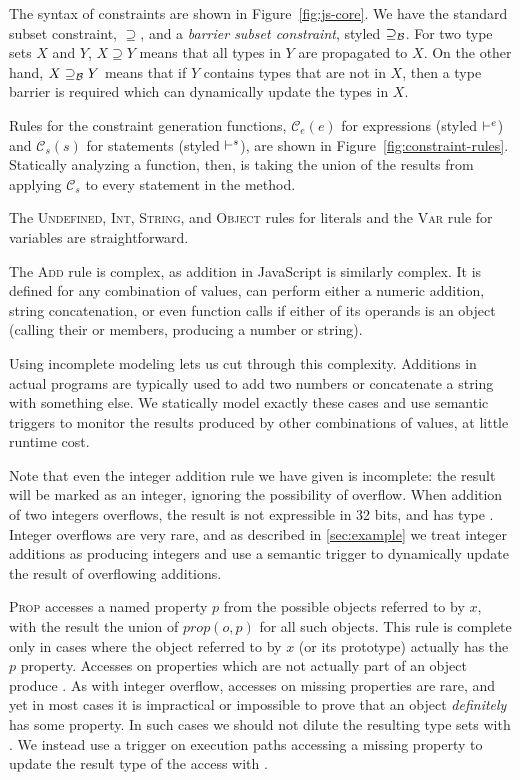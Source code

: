 The syntax of constraints are shown in Figure~\ref{fig:js-core}. We have the
standard subset constraint, $\supseteq$, and a \emph{barrier subset
  constraint}, styled $\supseteq_\mathcal{B}$. For two type sets $X$ and $Y$, $X \supseteq
Y$ means that all types in $Y$ are propagated to $X$. On the other hand, $X
\supseteq_\mathcal{B} Y$ means that if $Y$ contains types that are not in $X$, then a
type barrier is required which can dynamically update the types in $X$.

Rules for the constraint generation functions, $\mathcal{C}_e(e)$ for
expressions (styled $\vdash^e$) and $\mathcal{C}_s(s)$ for statements (styled $\vdash^s$),
are shown in
Figure~\ref{fig:constraint-rules}. Statically analyzing a function, then, is
taking the union of the results from applying $\mathcal{C}_s$ to every
statement in the method.

The \textsc{Undefined}, \textsc{Int}, \textsc{String}, and \textsc{Object}
rules for literals and the \textsc{Var} rule for variables are
straightforward.

The \textsc{Add} rule is complex, as addition in JavaScript is similarly complex. It is
defined for any combination of values, can perform either a numeric addition,
string concatenation, or even function calls if either of its operands is an
object (calling their  or  members, producing a
number or string).

Using incomplete modeling lets us cut through this complexity.
Additions in actual programs are typically used to add two numbers
or concatenate a string with something else.
We statically model exactly these cases
and use semantic triggers to monitor the results produced by other
combinations of values, at little runtime cost.

Note that even the integer addition rule we have given is incomplete: the
result will be marked as an integer, ignoring the possibility of
overflow. When addition of two integers overflows, the result is not
expressible in 32 bits, and has type .
Integer overflows are very rare, and as described in \Section\ref{sec:example}
we treat integer additions as producing integers
and use a semantic trigger to dynamically update the result of
overflowing additions.

\textsc{Prop} accesses a named property $p$ from the possible objects referred
to by $x$, with the result the union of $\mathit{prop}(o,p)$ for all such
objects.  This rule is complete only in cases where the object referred to by
$x$ (or its prototype) actually has the $p$ property. Accesses on properties
which are not actually part of an object produce .
As with integer overflow, accesses on missing properties are rare,
and yet in most cases it is impractical or impossible to prove that an object
\emph{definitely} has some property. In such cases we should not dilute the
resulting type sets with . We instead use a trigger
on execution paths accessing a missing property to update the result type
of the access with .

